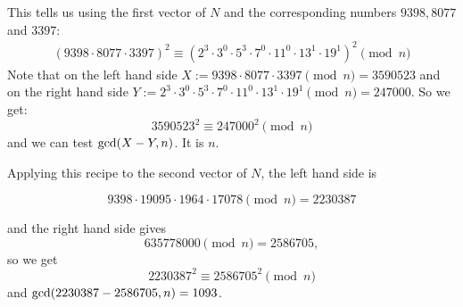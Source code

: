 \documentclass{report}
\begin{document}
This tells us using the first vector of $N$ and  the corresponding
numbers $9398, 8077$ and $3397$:
\[
 \begin{array}{cc}
  (9398 \cdot 8077 \cdot 3397)^2 \equiv (2^3 \cdot 3^0 \cdot 5^3 \cdot 7^0
  \cdot 11^0 \cdot 13^1 \cdot 19^1)^2 \pmod{n}
 \end{array}
 \]
 Note that on the left hand side  $X:=9398\cdot 8077 \cdot 3397 \pmod{n} = 3590523$
 and on the right hand side $Y:=2^3 \cdot 3^0 \cdot 5^3 \cdot 7^0 \cdot 11^0 \cdot 13^1 \cdot 19^1 \pmod{n} =  247000$. So we get:
 \[ 
  3590523^2 \equiv 247000^2 \pmod{n}
 \]
 and we can test ${\rm gcd}(X-Y,n)$. It is $n$.

 Applying this recipe to  the second vector of $N$,   the left hand side is

\[
 9398\cdot 19095 \cdot 1964 \cdot 17078 \pmod{n} = 2230387
\]

and the right hand side gives
\[
 635778000 \pmod{n} =   2586705,
\]
so we get
\[
 2230387^2 \equiv 2586705^2 \pmod{n}
\]
and ${\rm gcd}(2230387 - 2586705, n) = 1093$.
\end{document}
